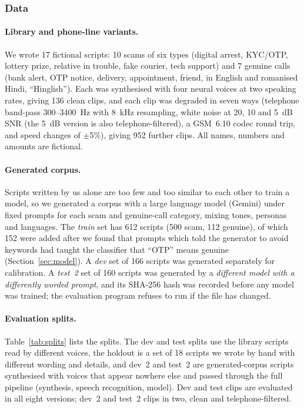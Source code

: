 \documentclass[letterpaper,12pt]{article}
\begin{document}
\subsubsection{Data}
\paragraph{Library and phone-line variants.} We wrote 17 fictional scripts: 10 scams of six types (digital arrest, KYC/OTP, lottery prize, relative in trouble, fake courier, tech support) and 7 genuine calls (bank alert, OTP notice, delivery, appointment, friend, in English and romanised Hindi, ``Hinglish''). Each was synthesised with four neural voices at two speaking rates, giving 136 clean clips, and each clip was degraded in seven ways (telephone band-pass 300--3400~Hz with 8~kHz resampling, white noise at 20, 10 and 5~dB SNR (the 5~dB version is also telephone-filtered), a GSM~6.10 codec round trip, and speed changes of $\pm$5\%), giving 952 further clips. All names, numbers and amounts are fictional.

\paragraph{Generated corpus.} Scripts written by us alone are too few and too similar to each other to train a model, so we generated a corpus with a large language model (Gemini) under fixed prompts for each scam and genuine-call category, mixing tones, personas and languages. The \emph{train} set has 612 scripts (500 scam, 112 genuine), of which 152 were added after we found that prompts which told the generator to avoid keywords had taught the classifier that ``OTP'' means genuine (Section~\ref{sec:model}). A \emph{dev} set of 166 scripts was generated separately for calibration. A \emph{test~2} set of 160 scripts was generated by a \emph{different model with a differently worded prompt}, and its SHA-256 hash was recorded before any model was trained; the evaluation program refuses to run if the file has changed.

\paragraph{Evaluation splits.} Table~\ref{tab:splits} lists the splits. The dev and test splits use the library scripts read by different voices, the holdout is a set of 18 scripts we wrote by hand with different wording and details, and dev~2 and test~2 are generated-corpus scripts synthesised with voices that appear nowhere else and passed through the full pipeline (synthesis, speech recognition, model). Dev and test clips are evaluated in all eight versions; dev~2 and test~2 clips in two, clean and telephone-filtered.
\end{document}
